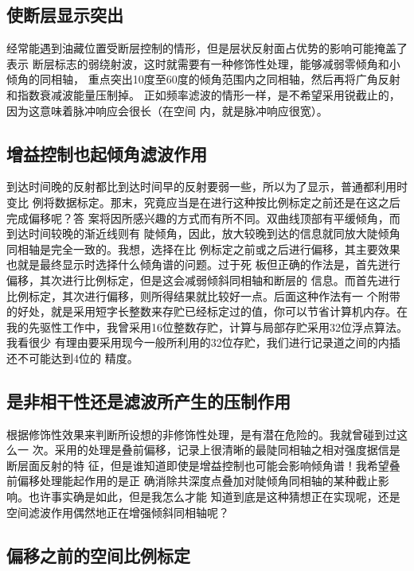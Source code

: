 \subsection{使断层显示突出}
\label{sec:4.1.10}

经常能遇到油藏位置受断层控制的情形，但是层状反射面占优势的影响可能掩盖了表示
断层标志的弱绕射波，这时就需要有一种修饰性处理，能够减弱零倾角和小倾角的同相轴，
重点突出10度至60度的倾角范围内之同相轴，然后再将广角反射和指数衰减波能量压制掉。
正如频率滤波的情形一样，是不希望采用锐截止的，因为这意味着脉冲响应会很长（在空间
内，就是脉冲响应很宽）。

\subsection{增益控制也起倾角滤波作用}
\label{sec:4.1.11}

到达时间晚的反射都比到达时间早的反射要弱一些，所以为了显示，普通都利用时变比
例将数据标定。那末，究竟应当是在进行这种按比例标定之前还是在这之后完成偏移呢？答
案将因所感兴趣的方式而有所不同。双曲线顶部有平缓倾角，而到达时间较晚的渐近线则有
陡倾角，因此，放大较晚到达的信息就同放大陡倾角同相轴是完全一致的。我想，选择在比
例标定之前或之后进行偏移，其主要效果也就是最终显示时选择什么倾角谱的问题。过于死
板但正确的作法是，首先迸行偏移，其次进行比例标定，但是这会减弱倾斜同相轴和断层的
信息。而首先进行比例标定，其次进行偏移，则所得结果就比较好一点。后面这种作法有一
个附带的好处，就是采用短字长整数来存贮已经标定过的值，你可以节省计算机内存。在
我的先驱性工作中，我曾采用16位整数存贮，计算与局部存贮采用32位浮点算法。我看很少
有理由要采用现今一般所利用的32位存贮，我们进行记录道之间的内插还不可能达到4位的
精度。

\subsection{是非相干性还是滤波所产生的压制作用}
\label{sec:4.1.12}

根据修饰性效果来判断所设想的非修饰性处理，是有潜在危险的。我就曾碰到过这么一
次。采用的处理是叠前偏移，记录上很清晰的最陡同相轴之相对强度据信是断层面反射的特
征，但是谁知道即使是增益控制也可能会影响倾角谱！我希望叠前偏移处理能起作用的是正
确消除共深度点叠加对陡倾角同相轴的某种截止影响。也许事实确是如此，但是我怎么才能
知道到底是这种猜想正在实现呢，还是空间滤波作用偶然地正在增强倾斜同相轴呢？

\subsection{偏移之前的空间比例标定}
\label{sec:4.1.13}

